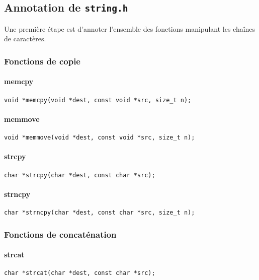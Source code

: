 \subsection{Annotation de \texttt{string.h}}

Une première étape est d'annoter l'ensemble des fonctions manipulant les chaînes
de caractères.

\subsubsection{Fonctions de copie}

\paragraph{memcpy}

\begin{Verbatim}
void *memcpy(void *dest, const void *src, size_t n);
\end{Verbatim}

\paragraph{memmove}

\begin{Verbatim}
void *memmove(void *dest, const void *src, size_t n);
\end{Verbatim}

\paragraph{strcpy}

\begin{Verbatim}
char *strcpy(char *dest, const char *src);
\end{Verbatim}

\paragraph{strncpy}

\begin{Verbatim}
char *strncpy(char *dest, const char *src, size_t n);
\end{Verbatim}

\subsubsection{Fonctions de concaténation}

\paragraph{strcat}
\begin{Verbatim}
char *strcat(char *dest, const char *src);
\end{Verbatim}
